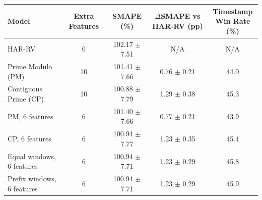\begin{tabular}{@{}lcccc@{}}
\toprule
Model & Extra Features & SMAPE (\%) & \shortstack{$\Delta$SMAPE\\vs HAR-RV (pp)} & \shortstack{Timestamp\\Win Rate (\%)} \\
\midrule
HAR-RV & 0 & 102.17 $\pm$ 7.51 & N/A & N/A \\
Prime Modulo (PM) & 10 & 101.41 $\pm$ 7.66 & 0.76 $\pm$ 0.21 & 44.0 \\
Contiguous Prime (CP) & 10 & 100.88 $\pm$ 7.79 & 1.29 $\pm$ 0.38 & 45.3 \\
PM, 6 features & 6 & 101.40 $\pm$ 7.66 & 0.77 $\pm$ 0.21 & 43.9 \\
CP, 6 features & 6 & 100.94 $\pm$ 7.77 & 1.23 $\pm$ 0.35 & 45.4 \\
Equal windows, 6 features & 6 & 100.94 $\pm$ 7.71 & 1.23 $\pm$ 0.29 & 45.8 \\
Prefix windows, 6 features & 6 & 100.94 $\pm$ 7.71 & 1.23 $\pm$ 0.29 & 45.9 \\
\bottomrule
\end{tabular}
